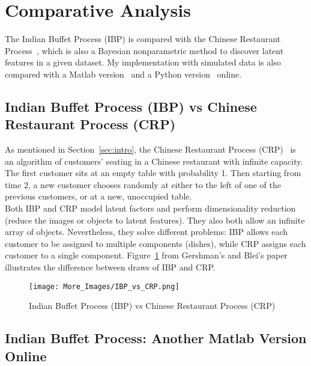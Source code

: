 \section{Comparative Analysis}

The Indian Buffet Process (IBP) is compared with the Chinese Restaurant Process~\cite{crp2004hierarchical}, which is also a Bayesian nonparametric method to discover latent features in a given dataset. My implementation with simulated data is also compared with a Matlab version~\cite{ibp2012code} and a Python version~\cite{ibpgithub} online.

\subsection{Indian Buffet Process (IBP) vs Chinese Restaurant Process (CRP)}

As mentioned in Section~\ref{sec:intro}, the Chinese Restaurant Process (CRP)~\cite{crp2004hierarchical} is an algorithm of customers' seating in a Chinese restaurant with infinite capacity. The first customer sits at an empty table with probability 1. Then starting from time 2, a new customer chooses randomly at either to the left of one of the previous customers, or at a new, unoccupied table.\\

Both IBP and CRP model latent factors and perform dimensionality reduction (reduce the images or objects to latent features). They also both allow an infinite array of objects. Nevertheless, they solve different problems: IBP allows each customer to be assigned to multiple components (dishes), while CRP assigns each customer to a single component. Figure~\ref{fig:CRP} from Gershman's and Blei's paper~\cite{gershman2012tutorial} illustrates the difference between draws of IBP and CRP.

\begin{figure}[!ht]
\centering
    \texttt{[image: More\_Images/IBP\_vs\_CRP.png]}
    \caption{Indian Buffet Process (IBP) vs Chinese Restaurant Process (CRP)~\cite{gershman2012tutorial}}
    \label{fig:CRP}
\end{figure}

\subsection{Indian Buffet Process: Another Matlab Version Online}

